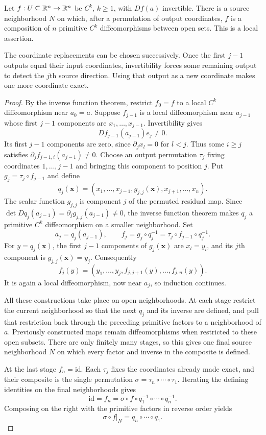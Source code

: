 \begin{theorem}\label{thm:primitive-factorization}
Let $f:U\subseteq\mathbb{R}^n\to\mathbb{R}^n$ be $C^k$, $k\geq1$, with $Df(a)$
invertible. There is a source neighborhood $N$ on which, after a
permutation of output coordinates, $f$ is a composition of $n$ primitive
$C^k$ diffeomorphisms between open sets. This is a local assertion.
\end{theorem}
The coordinate replacements can be chosen successively. Once the first
$j-1$ outputs equal their input coordinates, invertibility forces some
remaining output to detect the $j$th source direction. Using that output
as a new coordinate makes one more coordinate exact.
\begin{proof}
By the inverse function theorem, restrict $f_0=f$ to a local $C^k$
diffeomorphism near $a_0=a$. Suppose $f_{j-1}$ is a local diffeomorphism
near $a_{j-1}$ whose first $j-1$ components are $x_1,\ldots,x_{j-1}$.
Invertibility gives
\[
Df_{j-1}(a_{j-1})e_j\ne0.
\]
Its first $j-1$ components are zero, since $\partial_j x_l=0$ for
$l<j$. Thus some $i\geq j$ satisfies
$\partial_jf_{j-1,i}(a_{j-1})\ne0$. Choose an output permutation
$\tau_j$ fixing coordinates $1,\ldots,j-1$ and bringing this component
to position $j$. Put $g_j=\tau_j\circ f_{j-1}$ and define
\[
q_j(\mathbf{x})=(x_1,\ldots,x_{j-1},g_{j,j}(\mathbf{x}),x_{j+1},\ldots,x_n).
\]
The scalar function $g_{j,j}$ is component $j$ of the permuted residual map.
Since $\det Dq_j(a_{j-1})=\partial_jg_{j,j}(a_{j-1})\ne0$, the
inverse function theorem makes $q_j$ a primitive $C^k$ diffeomorphism
on a smaller neighborhood. Set
\[
a_j=q_j(a_{j-1}),\qquad
f_j=g_j\circ q_j^{-1}=\tau_j\circ f_{j-1}\circ q_j^{-1}.
\]
For $y=q_j(\mathbf{x})$, the first $j-1$ components of $g_j(\mathbf{x})$ are
$x_l=y_l$, and its $j$th component is $g_{j,j}(\mathbf{x})=y_j$. Consequently
\[
f_j(y)=(y_1,\ldots,y_j,f_{j,j+1}(y),\ldots,f_{j,n}(y)).
\]
It is again a local diffeomorphism, now near $a_j$, so induction continues.

All these constructions take place on open neighborhoods. At each stage
restrict the current neighborhood so that the next $q_j$ and its inverse
are defined, and pull that restriction back through the preceding
primitive factors to a neighborhood of $a$. Previously constructed maps
remain diffeomorphisms when restricted to these open subsets. There are
only finitely many stages, so this gives one final source neighborhood
$N$ on which every factor and inverse in the composite is defined.

At the last stage $f_n=\mathrm{id}$. Each $\tau_j$ fixes the coordinates
already made exact, and their composite is the single permutation
$\sigma=\tau_n\circ\cdots\circ\tau_1$. Iterating the defining identities
on the final neighborhoods gives
\[
\mathrm{id}=f_n
=\sigma\circ f\circ q_1^{-1}\circ\cdots\circ q_n^{-1}.
\]
Composing on the right with the primitive factors in reverse order yields
\[
\sigma\circ f|_N=q_n\circ\cdots\circ q_1.
\]
\end{proof}
